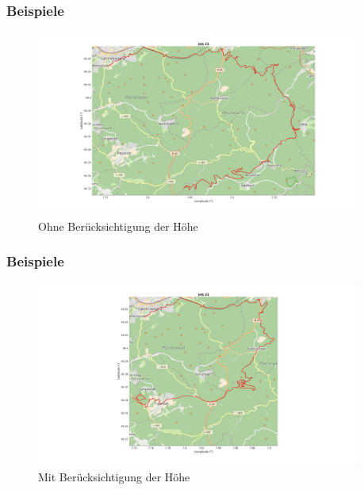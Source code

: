 \documentclass[aspectratio=43]{beamer}
\begin{document}
\begin{frame}
    \frametitle{Beispiele}
    \begin{figure}[t]
        \centering
        \includegraphics[width=0.95\textwidth]{bilder/noele.jpg}
        \caption{Ohne Berücksichtigung der Höhe}
    \end{figure}
\end{frame}

\begin{frame}
    \frametitle{Beispiele}
    \begin{figure}[t]
        \centering
        \includegraphics[width=0.95\textwidth]{bilder/ele.jpg}
        \caption{Mit Berücksichtigung der Höhe}
    \end{figure}
\end{frame}
\end{document}
